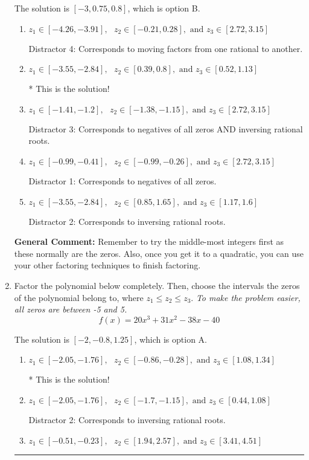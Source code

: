 \documentclass{extbook}[14pt]
\newcommand{\litem}[1]{\item #1

\rule{\textwidth}{0.4pt}}
\begin{document}
\begin{enumerate}
{The solution is \( [-3, 0.75, 0.8] \), which is option B.\begin{enumerate}[label=\Alph*.]
\item \( z_1 \in [-4.26, -3.91], \text{   }  z_2 \in [-0.21, 0.28], \text{   and   } z_3 \in [2.72, 3.15] \)

 Distractor 4: Corresponds to moving factors from one rational to another.
\item \( z_1 \in [-3.55, -2.84], \text{   }  z_2 \in [0.39, 0.8], \text{   and   } z_3 \in [0.52, 1.13] \)

* This is the solution!
\item \( z_1 \in [-1.41, -1.2], \text{   }  z_2 \in [-1.38, -1.15], \text{   and   } z_3 \in [2.72, 3.15] \)

 Distractor 3: Corresponds to negatives of all zeros AND inversing rational roots.
\item \( z_1 \in [-0.99, -0.41], \text{   }  z_2 \in [-0.99, -0.26], \text{   and   } z_3 \in [2.72, 3.15] \)

 Distractor 1: Corresponds to negatives of all zeros.
\item \( z_1 \in [-3.55, -2.84], \text{   }  z_2 \in [0.85, 1.65], \text{   and   } z_3 \in [1.17, 1.6] \)

 Distractor 2: Corresponds to inversing rational roots.
\end{enumerate}

\textbf{General Comment:} Remember to try the middle-most integers first as these normally are the zeros. Also, once you get it to a quadratic, you can use your other factoring techniques to finish factoring.
}
\litem{
Factor the polynomial below completely. Then, choose the intervals the zeros of the polynomial belong to, where $z_1 \leq z_2 \leq z_3$. \textit{To make the problem easier, all zeros are between -5 and 5.}
\[ f(x) = 20x^{3} +31 x^{2} -38 x -40 \]

The solution is \( [-2, -0.8, 1.25] \), which is option A.\begin{enumerate}[label=\Alph*.]
\item \( z_1 \in [-2.05, -1.76], \text{   }  z_2 \in [-0.86, -0.28], \text{   and   } z_3 \in [1.08, 1.34] \)

* This is the solution!
\item \( z_1 \in [-2.05, -1.76], \text{   }  z_2 \in [-1.7, -1.15], \text{   and   } z_3 \in [0.44, 1.08] \)

 Distractor 2: Corresponds to inversing rational roots.
\item \( z_1 \in [-0.51, -0.23], \text{   }  z_2 \in [1.94, 2.57], \text{   and   } z_3 \in [3.41, 4.51] \)


\end{enumerate}}
\end{enumerate}
\end{document}
